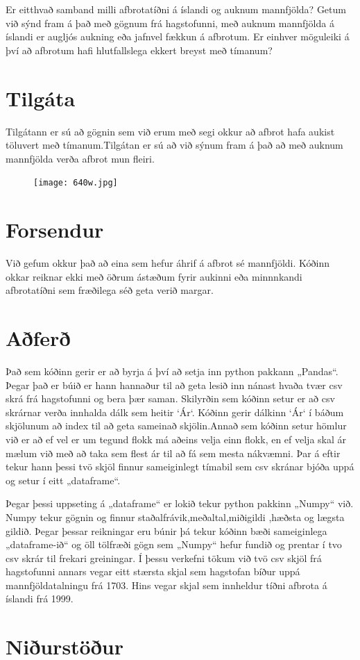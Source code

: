 \documentclass[12pt,a4paper]{article}
\begin{document}
	 Er eitthvað samband milli afbrotatíðni á íslandi og auknum mannfjölda? Getum við sýnd fram á það með gögnum frá hagstofunni, með auknum mannfjölda á íslandi er augljós aukning eða jafnvel fækkun á afbrotum.  Er einhver möguleiki á því að afbrotum hafi hlutfallslega ekkert breyst með tímanum?

\section{Tilgáta}

	Tilgátann er sú að gögnin sem við erum með segi okkur að afbrot hafa aukist töluvert með tímanum.Tilgátan er sú að við sýnum fram á það að með auknum mannfjölda verða afbrot mun fleiri.


\begin{figure}[h]
\texttt{[image: 640w.jpg]}

\end{figure}

\section{Forsendur}

	Við gefum okkur það að eina sem hefur áhrif á afbrot sé mannfjöldi. Kóðinn okkar reiknar ekki með öðrum ástæðum fyrir aukinni eða minnnkandi afbrotatíðni sem fræðilega séð geta verið margar. 

\section{Aðferð}

Það sem kóðinn gerir er að byrja á því að setja inn python pakkann „Pandas“. Þegar það er búið er hann hannaður til að geta lesið inn nánast hvaða tvær csv skrá frá hagstofunni og bera þær saman. Skilyrðin sem kóðinn setur er að csv skrárnar verða innhalda dálk sem heitir ‘Ár‘. Kóðinn gerir dálkinn ‘Ár‘ í báðum skjölunum að index til að geta sameinað skjölin.Annað sem kóðinn setur hömlur við er að ef vel er um tegund flokk má aðeins velja einn flokk, en ef velja skal ár mælum við með að taka sem flest ár til að fá sem mesta nákvæmni. Þar á eftir tekur hann þessi tvö skjöl finnur sameiginlegt tímabil sem csv skránar bjóða uppá og setur í eitt „dataframe“. 
	
Þegar þessi uppseting á „dataframe“ er lokið tekur python pakkinn „Numpy“ við. Numpy tekur gögnin og finnur staðalfrávik,meðaltal,miðigildi ,hæðsta og lægsta gildið. Þegar þessar reikningar eru búnir þá tekur kóðinn bæði sameiginlega „dataframe-ið“ og öll tölfræði gögn sem „Numpy“ hefur fundið og prentar í tvo csv skrár til frekari greiningar.
	Í þessu verkefni tökum við tvö csv skjöl frá hagstofunni annars vegar eitt stærsta skjal sem hagstofan bíður uppá mannfjöldatalningu frá 1703. Hins vegar skjal sem innheldur tíðni afbrota á íslandi frá 1999. 





\section{Niðurstöður}
\end{document}

